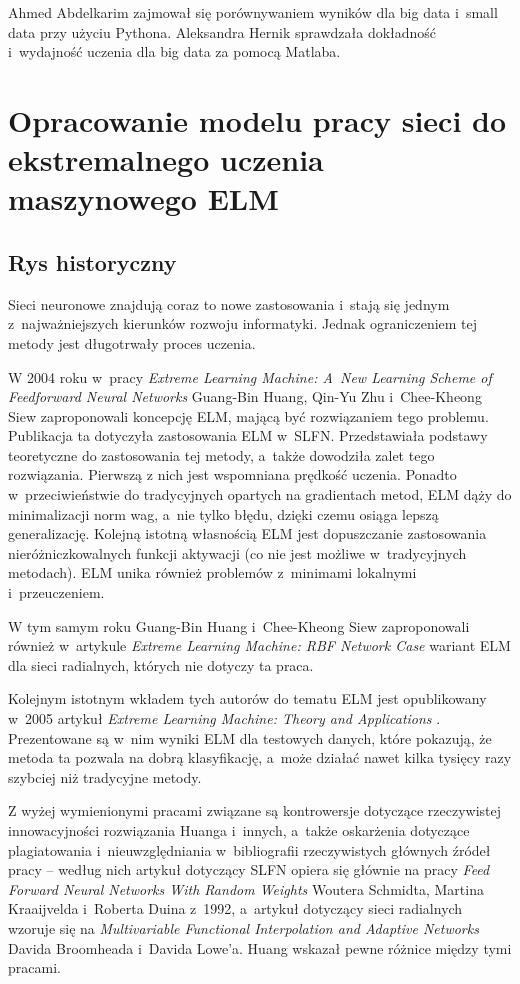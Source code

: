 \documentclass[pl]{minipw} %
\begin{document}
Ahmed Abdelkarim zajmował się porównywaniem wyników dla big data i~small data przy użyciu Pythona.
Aleksandra Hernik sprawdzała dokładność i~wydajność uczenia dla big data za pomocą Matlaba.

\clearpage
\chapter{Opracowanie modelu pracy sieci do ekstremalnego uczenia maszynowego ELM}
\section{Rys historyczny}
Sieci neuronowe znajdują coraz to nowe zastosowania i~stają się jednym z~najważniejszych kierunków rozwoju informatyki. Jednak ograniczeniem tej metody jest długotrwały proces uczenia.

W 2004 roku w~pracy \textit{Extreme Learning Machine: A~New Learning Scheme of Feedforward Neural Networks} \cite{huang-elm-base} Guang-Bin Huang, Qin-Yu Zhu i~Chee-Kheong Siew zaproponowali koncepcję ELM, mającą być rozwiązaniem tego problemu. Publikacja ta dotyczyła zastosowania ELM w~SLFN. Przedstawiała podstawy teoretyczne do zastosowania tej metody, a~także dowodziła zalet tego rozwiązania. Pierwszą z nich jest wspomniana prędkość uczenia. Ponadto w~przeciwieństwie do tradycyjnych opartych na gradientach metod, ELM dąży do minimalizacji norm wag, a~nie tylko błędu, dzięki czemu osiąga lepszą generalizację. Kolejną istotną własnością ELM jest dopuszczanie zastosowania nieróżniczkowalnych funkcji aktywacji (co nie jest możliwe w~tradycyjnych metodach). ELM unika również problemów z~minimami lokalnymi i~przeuczeniem. 

W tym samym roku Guang-Bin Huang i~Chee-Kheong Siew zaproponowali również w~artykule \textit{Extreme Learning Machine: RBF Network Case} \cite{huang-elm-rbf} wariant ELM dla sieci radialnych, których nie dotyczy ta praca. 

Kolejnym istotnym wkładem tych autorów do tematu ELM jest opublikowany w~2005 artykuł \textit{Extreme Learning Machine: Theory and Applications} \cite{huang-elm-tap}. Prezentowane są w~nim wyniki ELM dla testowych danych, które pokazują, że metoda ta pozwala na dobrą klasyfikację, a~może działać nawet kilka tysięcy razy szybciej niż tradycyjne metody.

Z wyżej wymienionymi pracami związane są kontrowersje dotyczące rzeczywistej innowacyjności rozwiązania Huanga i~innych, a~także oskarżenia dotyczące plagiatowania i~nieuwzględniania w~bibliografii rzeczywistych głównych źródeł pracy \cite{originofelm} -- według nich artykuł dotyczący SLFN opiera się głównie na pracy \textit{Feed Forward Neural Networks With Random Weights} Woutera Schmidta, Martina Kraaijvelda i~Roberta Duina z~1992, a~artykuł dotyczący sieci radialnych wzoruje się na \textit{Multivariable Functional Interpolation and Adaptive Networks} Davida Broomheada i~Davida Lowe'a. Huang wskazał pewne różnice między tymi pracami.
\end{document}
